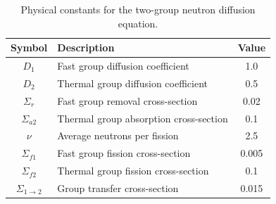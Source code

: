 \begin{table}[t]
\centering
\caption{Physical constants for the two-group neutron diffusion equation.}
\label{tab:physical_constants}
\begin{tabular}{clc}
\toprule
\textbf{Symbol} & \textbf{Description} & \textbf{Value} \\
\midrule
$D_1$ & Fast group diffusion coefficient & 1.0 \\
$D_2$ & Thermal group diffusion coefficient & 0.5 \\
$\Sigma_r$ & Fast group removal cross-section & 0.02 \\
$\Sigma_{a2}$ & Thermal group absorption cross-section & 0.1 \\
$\nu$ & Average neutrons per fission & 2.5 \\
$\Sigma_{f1}$ & Fast group fission cross-section & 0.005 \\
$\Sigma_{f2}$ & Thermal group fission cross-section & 0.1 \\
$\Sigma_{1\rightarrow2}$ & Group transfer cross-section & 0.015 \\
\bottomrule
\end{tabular}
\end{table}